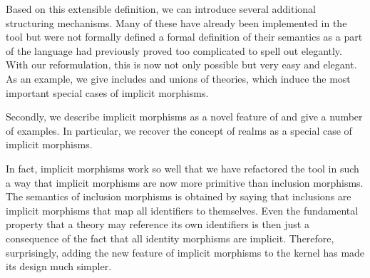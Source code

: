 Based on this extensible definition, we can introduce several additional structuring mechanisms.
Many of these have already been implemented in the \mmt tool but were not formally defined  a formal definition of their semantics as a part of the \mmt language had previously proved too complicated to spell out elegantly.
With our reformulation, this is now not only possible but very easy and elegant.
As an example, we give includes and unions of theories, which induce the most important special cases of implicit morphisms.

Secondly, we describe implicit morphisms as a novel feature of \mmt and give a number of examples.
In particular, we recover the concept of realms \cite{realms} as a special case of implicit morphisms.

In fact, implicit morphisms work so well that we have refactored the \mmt tool in such a way that implicit morphisms are now more primitive than inclusion morphisms.
The semantics of inclusion morphisms is obtained by saying that inclusions are implicit morphisms that map all identifiers to themselves.
Even the fundamental property that a theory may reference its own identifiers is then just a consequence of the fact that all identity morphisms are implicit.
Therefore, surprisingly, adding the new feature of implicit morphisms to the \mmt kernel has made its design much simpler.
